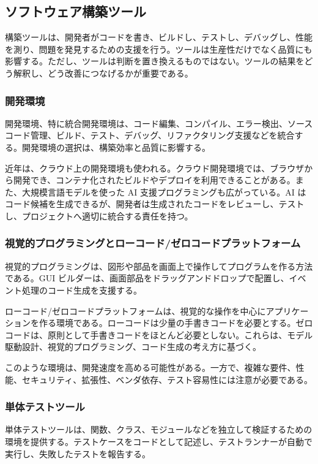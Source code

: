 \subsection{ソフトウェア構築ツール}

構築ツールは、開発者がコードを書き、ビルドし、テストし、デバッグし、性能を測り、問題を発見するための支援を行う。ツールは生産性だけでなく品質にも影響する。ただし、ツールは判断を置き換えるものではない。ツールの結果をどう解釈し、どう改善につなげるかが重要である。

\subsubsection{開発環境}

開発環境、特に統合開発環境は、コード編集、コンパイル、エラー検出、ソースコード管理、ビルド、テスト、デバッグ、リファクタリング支援などを統合する。開発環境の選択は、構築効率と品質に影響する。

近年は、クラウド上の開発環境も使われる。クラウド開発環境では、ブラウザから開発でき、コンテナ化されたビルドやデプロイを利用できることがある。また、大規模言語モデルを使った AI 支援プログラミングも広がっている。AI はコード候補を生成できるが、開発者は生成されたコードをレビューし、テストし、プロジェクトへ適切に統合する責任を持つ。

\subsubsection{視覚的プログラミングとローコード/ゼロコードプラットフォーム}

視覚的プログラミングは、図形や部品を画面上で操作してプログラムを作る方法である。GUI ビルダーは、画面部品をドラッグアンドドロップで配置し、イベント処理のコード生成を支援する。

ローコード/ゼロコードプラットフォームは、視覚的な操作を中心にアプリケーションを作る環境である。ローコードは少量の手書きコードを必要とする。ゼロコードは、原則として手書きコードをほとんど必要としない。これらは、モデル駆動設計、視覚的プログラミング、コード生成の考え方に基づく。

このような環境は、開発速度を高める可能性がある。一方で、複雑な要件、性能、セキュリティ、拡張性、ベンダ依存、テスト容易性には注意が必要である。

\subsubsection{単体テストツール}

単体テストツールは、関数、クラス、モジュールなどを独立して検証するための環境を提供する。テストケースをコードとして記述し、テストランナーが自動で実行し、失敗したテストを報告する。


